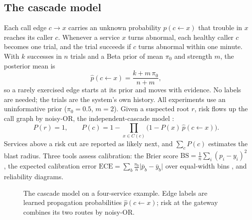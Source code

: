 \subsection{The cascade model}
\label{sec:cascade}
Each call edge $c \to x$ carries an unknown probability $p(c \leftarrow x)$ that trouble in $x$ reaches its caller $c$. Whenever a service $x$ turns abnormal, each healthy caller $c$ becomes one trial, and the trial succeeds if $c$ turns abnormal within one minute. With $k$ successes in $n$ trials and a Beta prior of mean $\pi_0$ and strength $m$, the posterior mean is
\begin{equation}
\hat p(c \leftarrow x) = \frac{k + m\,\pi_0}{n + m},
\end{equation}
so a rarely exercised edge starts at its prior and moves with evidence. No labels are needed; the trials are the system's own history. All experiments use an uninformative prior ($\pi_0 = 0.5$, $m = 2$). Given a suspected root $r$, risk flows up the call graph by noisy-OR, the independent-cascade model \cite{kempe2003influence}:
\begin{equation}
P(r) = 1, \qquad P(c) = 1 - \prod_{x \in C(c)} \bigl(1 - P(x)\, \hat p(c \leftarrow x)\bigr).
\label{eq:noisyor}
\end{equation}
Services above a risk cut are reported as likely next, and $\sum_c P(c)$ estimates the blast radius. Three tools assess calibration: the Brier score $\mathrm{BS} = \frac1n \sum_i (p_i - y_i)^2$ \cite{brier1950verification}, the expected calibration error $\mathrm{ECE} = \sum_b \frac{n_b}{n} \lvert \bar p_b - \bar y_b \rvert$ over equal-width bins \cite{guo2017calibration}, and reliability diagrams.

\begin{figure}[!htbp]
\centering
\resizebox{0.85\linewidth}{!}{}
\caption[The cascade model on a four-service example]{The cascade model on a four-service example. Edge labels are learned propagation probabilities $\hat p(c \leftarrow x)$; risk at the gateway combines its two routes by noisy-OR.}
\label{fig:prop}
\end{figure}

